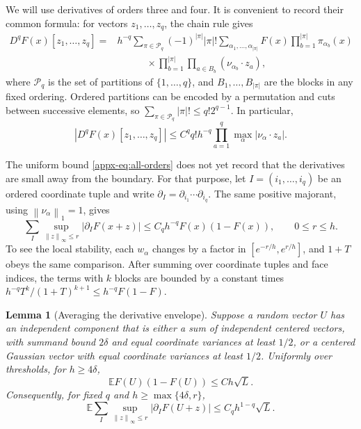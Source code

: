\documentclass[11pt,letterpaper]{article}
\newtheorem{lemma}{Lemma}
\theoremstyle{remark}
\newcommand{\E}{\mathbb E}
\newcommand{\cP}{\mathcal P}
\newcommand{\norm}[1]{\left\lVert#1\right\rVert}
\begin{document}
We will use derivatives of orders three and four.  It is convenient to
record their common formula: for vectors \(z_1,\ldots,z_q\), the chain
rule gives
\begin{equation}
 \begin{split}
 D^qF(x)[z_1,\ldots,z_q]
 ={}&h^{-q}\sum_{\pi\in\cP_q}(-1)^{|\pi|}|\pi|!
 \sum_{\alpha_1,\ldots,\alpha_{|\pi|}}
 F(x)\prod_{b=1}^{|\pi|}\pi_{\alpha_b}(x)\\
 &\hspace{3em}\times
 \prod_{b=1}^{|\pi|}\prod_{a\in B_b}
 (\nu_{\alpha_b}\cdot z_a),
 \end{split}
 \label{appx-eq:partition-derivative}
\end{equation}
where \(\cP_q\) is the set of partitions of \(\{1,\ldots,q\}\),
and \(B_1,\ldots,B_{|\pi|}\) are the blocks in any fixed ordering.
Ordered partitions can be encoded by a permutation and cuts between
successive elements, so
\(\sum_{\pi\in\cP_q}|\pi|!\le q!2^{q-1}\).
In particular,
\begin{equation}
 |D^qF(x)[z_1,\ldots,z_q]|
 \le C^q q!h^{-q}\prod_{a=1}^q
 \max_\alpha|\nu_\alpha\cdot z_a|.
 \label{appx-eq:all-orders}
\end{equation}

The uniform bound \eqref{appx-eq:all-orders} does not yet record that the
derivatives are small away from the boundary.  For that purpose, let
\(I=(i_1,\ldots,i_q)\) be an ordered coordinate tuple and write
\(\partial_I=\partial_{i_1}\cdots\partial_{i_q}\).
The same positive majorant, using \(\norm{\nu_\alpha}_1=1\), gives
\begin{equation}
 \sum_I\sup_{\norm z_\infty\le r}|\partial_IF(x+z)|
 \le C_qh^{-q}F(x)(1-F(x)),\qquad 0\le r\le h.
 \label{appx-eq:local-envelope}
\end{equation}
To see the local stability, each \(w_\alpha\) changes by a factor in
\([e^{-r/h},e^{r/h}]\), and \(1+T\) obeys the same comparison.
After summing over coordinate tuples and face indices, the terms with
\(k\) blocks are bounded by a constant times
\(h^{-q}T^k/(1+T)^{k+1}\le h^{-q}F(1-F)\).

\begin{lemma}[Averaging the derivative envelope]\label{appx-lem:envelope}
Suppose a random vector \(U\) has an independent component that is
either a sum of independent centered vectors, with summand bound
\(2\delta\) and equal coordinate variances at least \(1/2\), or a
centered Gaussian vector with equal coordinate variances at least
\(1/2\).
Uniformly over thresholds, for \(h\ge4\delta\),
\begin{equation}
 \E F(U)(1-F(U))\le Ch\sqrt L.
 \label{appx-eq:small-envelope}
\end{equation}
Consequently, for fixed \(q\) and \(h\ge\max\{4\delta,r\}\),
\begin{equation}
 \E\sum_I\sup_{\norm z_\infty\le r}|\partial_IF(U+z)|
 \le C_q h^{1-q}\sqrt L.
 \label{appx-eq:averaged-derivatives}
\end{equation}
\end{lemma}
\end{document}
